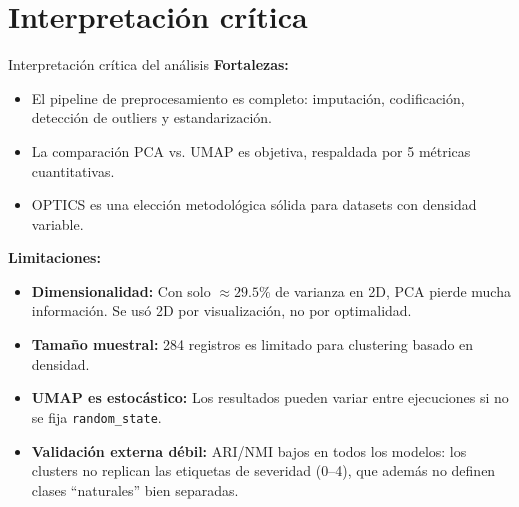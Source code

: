 \documentclass[10pt,aspectratio=169]{beamer}
\begin{document}
\section{Interpretación crítica}

\begin{frame}{Interpretación crítica del análisis}
  \textbf{Fortalezas:}
  \begin{itemize}
    \item El pipeline de preprocesamiento es completo: imputación, codificación, detección de outliers y estandarización.
    \item La comparación PCA vs. UMAP es objetiva, respaldada por 5 métricas cuantitativas.
    \item OPTICS es una elección metodológica sólida para datasets con densidad variable.
  \end{itemize}

  \vspace{0.3cm}
  \textbf{Limitaciones:}
  \begin{itemize}
    \item \textbf{Dimensionalidad:} Con solo $\approx 29.5\%$ de varianza en 2D, PCA pierde mucha información. Se usó 2D por visualización, no por optimalidad.
    \item \textbf{Tamaño muestral:} 284 registros es limitado para clustering basado en densidad.
    \item \textbf{UMAP es estocástico:} Los resultados pueden variar entre ejecuciones si no se fija \texttt{random\_state}.
    \item \textbf{Validación externa débil:} ARI/NMI bajos en todos los modelos: los clusters no replican las etiquetas de severidad (0--4), que además no definen clases ``naturales'' bien separadas.
  \end{itemize}
\end{frame}
\end{document}
